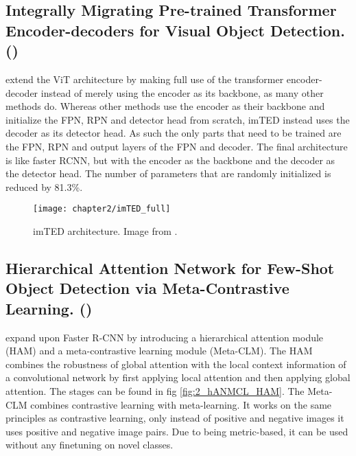 


\subsection*{Integrally Migrating Pre-trained Transformer Encoder-decoders
for Visual Object Detection. (\citet{imTED})}

\citet{imTED} extend the ViT architecture by making full use of the transformer encoder-decoder instead of merely using the encoder as its backbone, as many other methods do. Whereas other methods use the encoder as their backbone and initialize the FPN, RPN and detector head from scratch, imTED instead uses the decoder as its detector head. As such the only parts that need to be trained are the FPN, RPN and output layers of the FPN and decoder. The final architecture is like faster RCNN, but with the encoder as the backbone and the decoder as the detector head. The number of parameters that are randomly initialized is reduced by 81.3\%.


\begin{figure}[h]
	\centering
	\texttt{[image: chapter2/imTED\_full]}
	\caption{\label{fig:2_imTED_full} imTED architecture. Image from \citet{imTED}.}
\end{figure}

\subsection*{Hierarchical Attention Network for Few-Shot
Object Detection via Meta-Contrastive Learning. (\citet{hANMCL})}

\citet{hANMCL} expand upon Faster R-CNN \citep{fasterrcnn} by introducing a  hierarchical attention module (HAM) and a meta-contrastive learning module (Meta-CLM). The HAM combines the robustness of global attention with the local context information of a convolutional network by first applying local attention and then applying global attention. The stages can be found in fig \ref{fig:2_hANMCL_HAM}. The Meta-CLM combines contrastive learning with meta-learning. It works on the same principles as contrastive learning, only instead of positive and negative images it uses positive and negative image pairs. Due to being metric-based, it can be used without any finetuning on novel classes.

